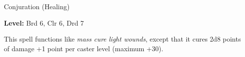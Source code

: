 \label{spell:Mass Cure Moderate Wounds}

Conjuration (Healing)

\textbf{Level:} Brd 6, Clr 6, Drd 7

This spell functions like \textit{mass cure light wounds}, except that it cures 
2d8 points of damage +1 point per caster level (maximum +30).

